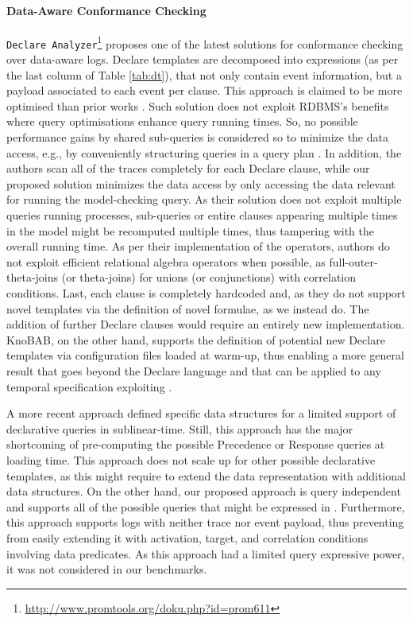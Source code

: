 \paragraph*{Data-Aware Conformance Checking}
\texttt{Declare Analyzer}\footnote{\url{http://www.promtools.org/doku.php?id=prom611}} \cite{BurattinMS16} proposes one of the latest solutions for conformance checking over data-aware logs. Declare templates are decomposed into \LTLf expressions (as per the last column of Table \ref{tab:dt}), that not only contain event information, but a payload associated to each event per clause. 
This approach is claimed to be  more optimised than prior works \cite{VanDerAalst2005}.  
Such solution
does not exploit RDBMS's 
benefits %
where %
query optimisations enhance query running times. 
So, no possible performance gains by shared sub-queries 
is considered so to minimize the data access, e.g., by conveniently 
structuring queries in a query plan \cite{BellatrecheKB21}. 
In addition, the authors
scan all of the traces completely for each Declare clause, while our proposed solution minimizes the data access by only accessing the data relevant for running the model-checking query. 
As their solution does not exploit multiple queries running processes, sub-queries or entire clauses appearing multiple times in the model might be recomputed multiple times, thus tampering with the overall running time.
As per their implementation of the \LTLf operators, authors do not exploit efficient relational algebra operators when possible, as full-outer-theta-joins (or theta-joins) for unions (or conjunctions) with correlation conditions.
%
Last, each clause is completely hardcoded and, as they do not support novel templates via the definition of novel \LTLf formulae, as we instead do. The addition of further Declare clauses would require an entirely new implementation. KnoBAB, on the other hand, supports the definition of potential new Declare templates via configuration files loaded at warm-up, %
thus enabling a more general result that goes beyond the Declare language and that can be applied to any temporal specification exploiting \LTLf.

A more recent approach \cite{abs-2112-04623} defined specific data structures for a limited support of declarative queries in sublinear-time. Still, this approach has the major shortcoming of pre-computing the possible \textsf{Precedence} or \textsf{Response} queries at loading time. This approach does not scale up for other possible declarative templates, as this might require to extend the data representation  with additional data structures. On the other hand, our proposed approach is query independent and supports all of the possible queries that might be expressed in \xLTLf. Furthermore, this approach supports logs with neither trace nor event payload, thus preventing from easily extending it with activation, target, and correlation conditions involving data predicates. As this approach had a limited query expressive power, it was not considered in our benchmarks.

